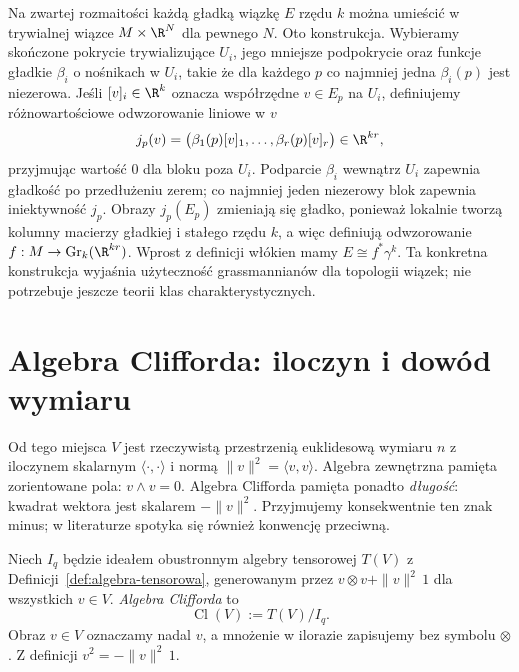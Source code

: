 \begin{uwaga}
Na zwartej rozmaitości każdą gładką wiązkę $E$
rzędu $k$ można umieścić w trywialnej wiązce
$M\times\R^N$ dla pewnego $N$.
Oto konstrukcja. Wybieramy skończone pokrycie
trywializujące $U_i$, jego mniejsze podpokrycie
oraz funkcje gładkie $\beta_i$ o nośnikach w $U_i$,
takie że dla każdego $p$ co najmniej jedna
$\beta_i(p)$ jest niezerowa. Jeśli $[v]_i\in\R^k$
oznacza współrzędne $v\in E_p$ na $U_i$,
definiujemy różnowartościowe odwzorowanie liniowe w $v$
\[
 j_p(v)=\bigl(\beta_1(p)[v]_1,\ldots,
                  \beta_r(p)[v]_r\bigr)\in\R^{kr},
\]
przyjmując wartość $0$ dla bloku poza $U_i$.
Podparcie $\beta_i$ wewnątrz $U_i$ zapewnia
gładkość po przedłużeniu zerem; co najmniej
jeden niezerowy blok zapewnia iniektywność $j_p$.
Obrazy $j_p(E_p)$ zmieniają się gładko, ponieważ
lokalnie tworzą kolumny macierzy gładkiej i
stałego rzędu $k$, a więc definiują odwzorowanie
$f:M\to\operatorname{Gr}_k(\R^{kr})$.
Wprost z definicji włókien mamy
$E\cong f^*\gamma^k$. Ta konkretna konstrukcja
wyjaśnia użyteczność grassmannianów dla topologii
wiązek; nie potrzebuje jeszcze teorii klas
charakterystycznych.
\end{uwaga}

\section{Algebra Clifforda: iloczyn i dowód wymiaru}
\label{sec:clifford}

Od tego miejsca $V$ jest rzeczywistą przestrzenią
euklidesową wymiaru $n$ z iloczynem skalarnym
$\langle\cdot,\cdot\rangle$ i normą
$\|v\|^2=\langle v,v\rangle$. Algebra zewnętrzna
pamięta zorientowane pola: $v\wedge v=0$.
Algebra Clifforda pamięta ponadto \emph{długość}:
kwadrat wektora jest skalarem $-\|v\|^2$.
Przyjmujemy konsekwentnie ten znak minus;
w literaturze spotyka się również konwencję przeciwną.

\begin{definicja}
\label{def:clifford}
Niech $I_q$ będzie ideałem obustronnym algebry
tensorowej $T(V)$ z Definicji~\ref{def:algebra-tensorowa},
generowanym przez
$v\otimes v+\|v\|^2\,1$ dla wszystkich $v\in V$.
\emph{Algebra Clifforda} to
\[
 \operatorname{Cl}(V):=T(V)/I_q.
\]
Obraz $v\in V$ oznaczamy nadal $v$,
a mnożenie w ilorazie zapisujemy bez symbolu $\otimes$.
Z definicji $v^2=-\|v\|^2\,1$.
\end{definicja}

